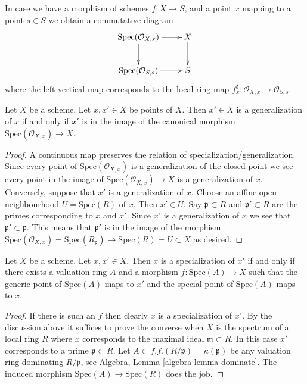 \medskip\noindent
In case we have a morphism of schemes $f : X \to S$,
and a point $x$ mapping to a point $s \in S$ we obtain
a commutative diagram
$$
\xymatrix{
\text{Spec}(\mathcal{O}_{X, x}) \ar[r] \ar[d] & X \ar[d] \\
\text{Spec}(\mathcal{O}_{S, s}) \ar[r] & S
}
$$
where the left vertical map corresponds to the local ring map
$f^\sharp_x : \mathcal{O}_{X, x} \to \mathcal{O}_{S, s}$.

\begin{lemma}
\label{lemma-specialize-points}
Let $X$ be a scheme.
Let $x, x' \in X$ be points of $X$.
Then $x' \in X$ is a generalization of $x$ if and only if
$x'$ is in the image of the canonical morphism
$\text{Spec}(\mathcal{O}_{X, x}) \to X$.
\end{lemma}

\begin{proof}
A continuous map preserves the relation of specialization/generalization.
Since every point of $\text{Spec}(\mathcal{O}_{X, x})$ is a
generalization of the closed point we see every point in the image
of $\text{Spec}(\mathcal{O}_{X, x}) \to X$ is a generalization of $x$.
Conversely, suppose that $x'$ is a generalization of $x$.
Choose an affine open neighbourhood $U = \text{Spec}(R)$ of
$x$. Then $x' \in U$. Say $\mathfrak p \subset R$ and
$\mathfrak p' \subset R$ are the primes corresponding
to $x$ and $x'$. Since $x'$ is a generalization of $x$
we see that $\mathfrak p' \subset \mathfrak p$. This means
that $\mathfrak p'$ is in the image of the morphism
$\text{Spec}(\mathcal{O}_{X, x}) = \text{Spec}(R_{\mathfrak p})
\to \text{Spec}(R) = U \subset X$ as desired.
\end{proof}

\begin{lemma}
\label{lemma-points-specialize}
Let $X$ be a scheme. Let $x, x' \in X$.
Then $x$ is a specialization of $x'$ if and only if
there exists a valuation ring $A$ and a morphism
$f : \text{Spec}(A) \to X$ such that the generic
point of $\text{Spec}(A)$ maps to $x'$ and the special
point of $\text{Spec}(A)$ maps to $x$.
\end{lemma}

\begin{proof}
If there is such an $f$ then clearly $x$ is a specialization of $x'$.
By the discussion above it suffices to prove the converse when
$X$ is the spectrum of a local ring $R$ where $x$ corresponds
to the maximal ideal $\mathfrak m \subset R$. In this case
$x'$ corresponds to a prime $\mathfrak p \subset R$.
Let $A \subset f.f.(R/\mathfrak p) = \kappa(\mathfrak p)$
be any valuation ring dominating $R/\mathfrak p$, see
Algebra, Lemma \ref{algebra-lemma-dominate}. The induced morphism
$\text{Spec}(A) \to \text{Spec}(R)$ does the job.
\end{proof}


